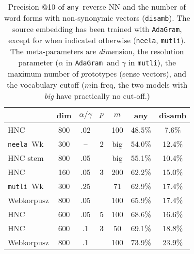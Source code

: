 \documentclass[11pt]{article}
\newcommand{\neelakantan}{\texttt{neela}}
\newcommand{\adagram}{\texttt{AdaGram}}
\newcommand{\mutli}{\texttt{mutli}}
\newcommand{\any}{\texttt{any}}
\newcommand{\disamb}{\texttt{disamb}}
\begin{document}
\begin{table}
  \centering\small
    \begin{tabular}{lcccc|cc}
      \toprule
        & dim & $\alpha/\gamma$ & $p$ & $m$ & any & disamb \\
      \midrule
      HNC	        & 800	& .02	&       & 100   & 48.5\%	&  7.6\% \\
      \neelakantan~Wk&300&--&2   &big  & 54.0\%	&  12.4\% \\
      HNC stem & 800	& .05	&       &  big & 55.1\%	&  10.4\% \\
      HNC         & 160 & .05 & 3     & 200   & 62.2\%	&  15.0\% \\
      \mutli~Wk &300&.25 &       & 71    & 62.9\%	&  17.4\% \\
      Webkorpusz	    & 800	& .05	&       & 100	  & 65.9\%	&  17.4\% \\
      HNC	        & 600	& .05	& 5     & 100	  & 68.6\%	&  16.6\% \\
      HNC	        & 600	& .1  & 3     & 50	  & 69.1\%	&  18.8\% \\
      Webkorpusz	    & 800	& .1  &       & 100	  & 73.9\%	&  23.9\% \\
      \bottomrule
    \end{tabular}
  \caption{Precision @10 of \any~reverse NN and the number of word forms with
  non-synonymic vectors (\disamb).  The source embedding has been trained with
  \adagram, except for when indicated otherwise (\neelakantan,
  \mutli).  
  The meta-parameters are \emph{dim}ension, the
  resolution parameter ($\alpha$ in \adagram~and $\gamma$ in \mutli), the
  maximum number of $p$rototypes (sense vectors), and the vocabulary cutoff
  ($m$in-freq, the two models with \emph{big} have practically no cut-off.)}
    \label{tab:prec}
\end{table}
\end{document}
